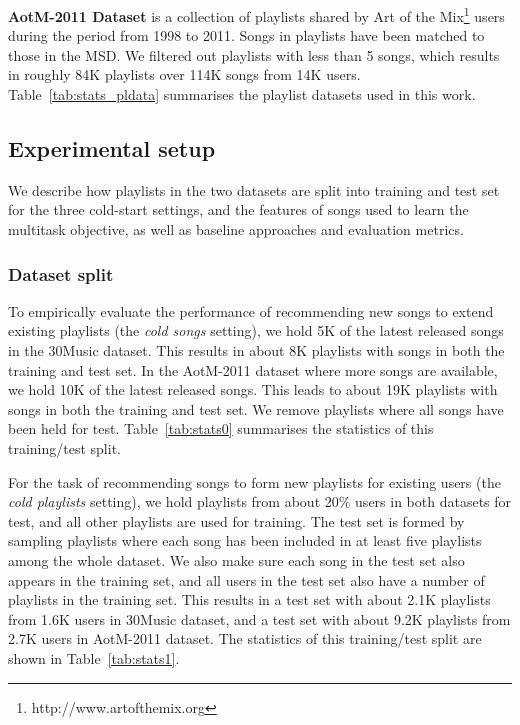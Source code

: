 \noindent
{\bf AotM-2011 Dataset} is a collection of playlists shared by Art of the Mix\footnote{http://www.artofthemix.org} 
users during the period from 1998 to 2011. Songs in playlists have been matched to those in the MSD.
We filtered out playlists with less than 5 songs, which results in roughly 84K playlists over 114K songs from 14K users.
%
Table~\ref{tab:stats_pldata} summarises the %
playlist datasets used in this work.





\subsection{Experimental setup}

We describe how playlists in the two datasets are split into training and test set for the three cold-start settings,
and the features of songs used to learn the multitask objective, as well as baseline approaches and evaluation metrics.

\subsubsection{Dataset split}
To empirically evaluate the performance of recommending new songs to extend existing playlists (\ie the \emph{cold songs} setting),
we hold 5K of the latest released songs in the 30Music dataset. 
This results in about 8K playlists with songs in both the training and test set.
In the AotM-2011 dataset where more songs are available, we hold 10K of the latest released songs.
This leads to about 19K playlists with songs in both the training and test set.
We remove playlists where all songs have been held for test. %
Table~\ref{tab:stats0} summarises the statistics of this training/test split.

For the task of recommending songs to form new playlists for existing users (\ie the \emph{cold playlists} setting),
we hold playlists from about 20\% users in both datasets for test, and all other playlists are used for training.
The test set is formed by sampling playlists where each song has been included in at least five playlists among the whole dataset.
We also make sure each song in the test set also appears in the training set,
and all users in the test set also have a number of playlists in the training set.
This results in a test set with about 2.1K playlists from 1.6K users in 30Music dataset,
and a test set with about 9.2K playlists from 2.7K users in AotM-2011 dataset.
The statistics of this training/test split are shown in Table~\ref{tab:stats1}.

